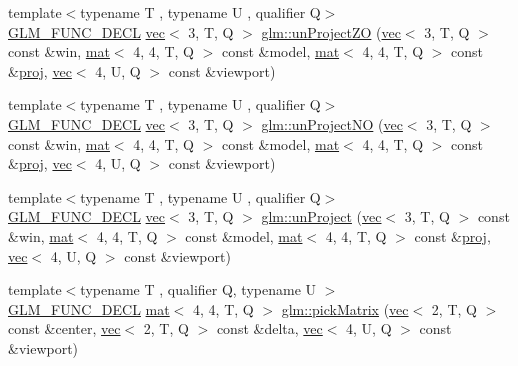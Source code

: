 \begin{DoxyCompactItemize}
\item 
{\footnotesize template$<$typename T , typename U , qualifier Q$>$ }\\\mbox{\hyperlink{setup_8hpp_ab2d052de21a70539923e9bcbf6e83a51}{G\+L\+M\+\_\+\+F\+U\+N\+C\+\_\+\+D\+E\+CL}} \mbox{\hyperlink{structglm_1_1vec}{vec}}$<$ 3, T, Q $>$ \mbox{\hyperlink{group__gtc__matrix__transform_gade5136413ce530f8e606124d570fba32}{glm\+::un\+Project\+ZO}} (\mbox{\hyperlink{structglm_1_1vec}{vec}}$<$ 3, T, Q $>$ const \&win, \mbox{\hyperlink{structglm_1_1mat}{mat}}$<$ 4, 4, T, Q $>$ const \&model, \mbox{\hyperlink{structglm_1_1mat}{mat}}$<$ 4, 4, T, Q $>$ const \&\mbox{\hyperlink{group__gtx__projection_ga58384b7170801dd513de46f87c7fb00e}{proj}}, \mbox{\hyperlink{structglm_1_1vec}{vec}}$<$ 4, U, Q $>$ const \&viewport)
\item 
{\footnotesize template$<$typename T , typename U , qualifier Q$>$ }\\\mbox{\hyperlink{setup_8hpp_ab2d052de21a70539923e9bcbf6e83a51}{G\+L\+M\+\_\+\+F\+U\+N\+C\+\_\+\+D\+E\+CL}} \mbox{\hyperlink{structglm_1_1vec}{vec}}$<$ 3, T, Q $>$ \mbox{\hyperlink{group__gtc__matrix__transform_gae089ba9fc150ff69c252a20e508857b5}{glm\+::un\+Project\+NO}} (\mbox{\hyperlink{structglm_1_1vec}{vec}}$<$ 3, T, Q $>$ const \&win, \mbox{\hyperlink{structglm_1_1mat}{mat}}$<$ 4, 4, T, Q $>$ const \&model, \mbox{\hyperlink{structglm_1_1mat}{mat}}$<$ 4, 4, T, Q $>$ const \&\mbox{\hyperlink{group__gtx__projection_ga58384b7170801dd513de46f87c7fb00e}{proj}}, \mbox{\hyperlink{structglm_1_1vec}{vec}}$<$ 4, U, Q $>$ const \&viewport)
\item 
{\footnotesize template$<$typename T , typename U , qualifier Q$>$ }\\\mbox{\hyperlink{setup_8hpp_ab2d052de21a70539923e9bcbf6e83a51}{G\+L\+M\+\_\+\+F\+U\+N\+C\+\_\+\+D\+E\+CL}} \mbox{\hyperlink{structglm_1_1vec}{vec}}$<$ 3, T, Q $>$ \mbox{\hyperlink{group__gtc__matrix__transform_ga36641e5d60f994e01c3d8f56b10263d2}{glm\+::un\+Project}} (\mbox{\hyperlink{structglm_1_1vec}{vec}}$<$ 3, T, Q $>$ const \&win, \mbox{\hyperlink{structglm_1_1mat}{mat}}$<$ 4, 4, T, Q $>$ const \&model, \mbox{\hyperlink{structglm_1_1mat}{mat}}$<$ 4, 4, T, Q $>$ const \&\mbox{\hyperlink{group__gtx__projection_ga58384b7170801dd513de46f87c7fb00e}{proj}}, \mbox{\hyperlink{structglm_1_1vec}{vec}}$<$ 4, U, Q $>$ const \&viewport)
\item 
{\footnotesize template$<$typename T , qualifier Q, typename U $>$ }\\\mbox{\hyperlink{setup_8hpp_ab2d052de21a70539923e9bcbf6e83a51}{G\+L\+M\+\_\+\+F\+U\+N\+C\+\_\+\+D\+E\+CL}} \mbox{\hyperlink{structglm_1_1mat}{mat}}$<$ 4, 4, T, Q $>$ \mbox{\hyperlink{group__gtc__matrix__transform_gaf6b21eadb7ac2ecbbe258a9a233b4c82}{glm\+::pick\+Matrix}} (\mbox{\hyperlink{structglm_1_1vec}{vec}}$<$ 2, T, Q $>$ const \&center, \mbox{\hyperlink{structglm_1_1vec}{vec}}$<$ 2, T, Q $>$ const \&delta, \mbox{\hyperlink{structglm_1_1vec}{vec}}$<$ 4, U, Q $>$ const \&viewport)

\end{DoxyCompactItemize}
